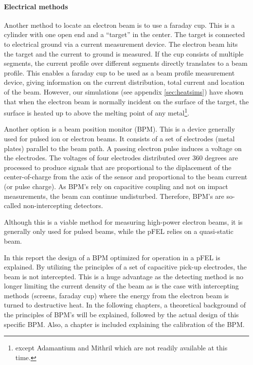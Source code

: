 \paragraph{Electrical methods}
Another method to locate an electron beam is to use a faraday cup. This is a cylinder with one open end and a ``target'' in the center. The target is connected to electrical ground via a current measurement device. 
The electron beam hits the target and the current to ground is measured. If the cup consists of multiple segments, the current profile over different segments directly translates to a beam profile.
This enables a faraday cup to be used as a beam profile measurement device, giving information on the current distribution, total current and location of the beam.
However, our simulations (see appendix \ref{sec:heatsims}) have shown that when the electron beam is normally incident on the surface of the target, the surface is heated up to above the melting point of any metal\footnote{except Adamantium and Mithril which are not readily available at this time.}.

Another option is a beam position monitor (BPM). This is a device generally used for pulsed ion or electron beams. It consists of a set of electrodes (metal plates) parallel to the beam path. A passing electron pulse induces a voltage on the electrodes. The voltages of four electrodes distributed over 360 degrees are processed to produce signals that are proportional to the diplacement of the center-of-charge from the axis of the sensor and proportional to the beam current (or pulse charge).
As BPM's rely on capacitive coupling and not on impact measurements, the beam can continue undisturbed. Therefore, BPM's are so-called non-intercepting detectors.

Although this is a viable method for measuring high-power electron beams, it is generally only used for pulsed beams, while the pFEL relies on a quasi-static beam.

In this report the design of a BPM optimized for operation in a pFEL is explained.
By utilizing the principles of a set of capacitive pick-up electrodes, the beam is not intercepted. This is a huge advantage as the detecting method is no longer limiting the current density of the beam as is the case with intercepting methods (screens, faraday cup) where the energy from the electron beam is turned to destructive heat. 
In the following chapters, a theoretical background of the principles of BPM's will be explained, followed by the actual design of this specific BPM. Also, a chapter is included explaining the calibration of the BPM.

